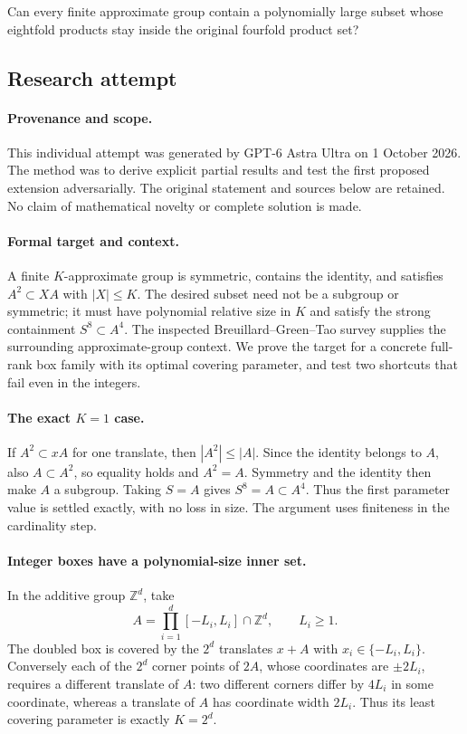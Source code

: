 \documentclass[11pt,a4paper]{article}
\newcommand{\Z}{\mathbb{Z}}
\begin{document}
Can every finite approximate group contain a polynomially large subset whose eightfold products stay inside the original fourfold product set?

\subsection{Research attempt}

\paragraph{Provenance and scope.}
This individual attempt was generated by GPT-6 Astra Ultra on 1 October 2026. The method was to derive explicit partial results and test the first proposed extension adversarially. The original statement and sources below are retained. No claim of mathematical novelty or complete solution is made.

\paragraph{Formal target and context.}
A finite $K$-approximate group is symmetric, contains the identity, and satisfies $A^2\subset XA$ with $|X|\leq K$. The desired subset need not be a subgroup or symmetric; it must have polynomial relative size in $K$ and satisfy the strong containment $S^8\subset A^4$. The inspected Breuillard--Green--Tao survey supplies the surrounding approximate-group context. We prove the target for a concrete full-rank box family with its optimal covering parameter, and test two shortcuts that fail even in the integers.

\paragraph{The exact $K=1$ case.}
If $A^2\subset xA$ for one translate, then $|A^2|\leq|A|$. Since the identity belongs to $A$, also $A\subset A^2$, so equality holds and $A^2=A$. Symmetry and the identity then make $A$ a subgroup. Taking $S=A$ gives $S^8=A\subset A^4$. Thus the first parameter value is settled exactly, with no loss in size. The argument uses finiteness in the cardinality step.

\paragraph{Integer boxes have a polynomial-size inner set.}
In the additive group $\Z^d$, take
\[
 A=\prod_{i=1}^d[-L_i,L_i]\cap\Z^d,\qquad L_i\geq1.
\]
The doubled box is covered by the $2^d$ translates $x+A$ with $x_i\in\{-L_i,L_i\}$. Conversely each of the $2^d$ corner points of $2A$, whose coordinates are $\pm2L_i$, requires a different translate of $A$: two different corners differ by $4L_i$ in some coordinate, whereas a translate of $A$ has coordinate width $2L_i$. Thus its least covering parameter is exactly $K=2^d$.
\end{document}
